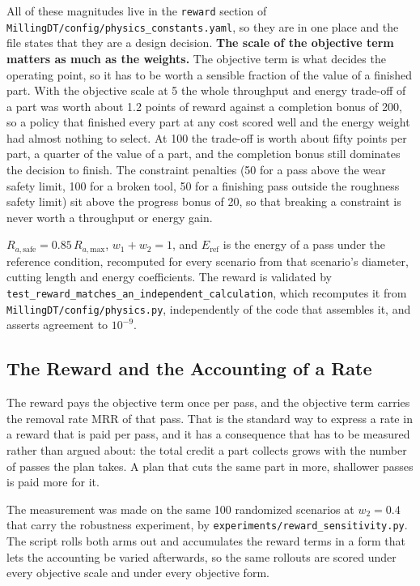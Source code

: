 \documentclass[11pt,a4paper]{article}
\newcommand{\MRR}{\mathrm{MRR}}
\newcommand{\RaSafe}{R_{a,\text{safe}}}
\newcommand{\RaMax}{R_{a,\text{max}}}
\begin{document}
All of these magnitudes live in the \texttt{reward} section of \texttt{MillingDT/\allowbreak config/\allowbreak physics\_\allowbreak constants.yaml}, so they are in one place and the file states that they are a design decision. \textbf{The scale of the objective term matters as much as the weights.} The objective term is what decides the operating point, so it has to be worth a sensible fraction of the value of a finished part. With the objective scale at 5 the whole throughput and energy trade-off of a part was worth about 1.2 points of reward against a completion bonus of 200, so a policy that finished every part at any cost scored well and the energy weight had almost nothing to select. At 100 the trade-off is worth about fifty points per part, a quarter of the value of a part, and the completion bonus still dominates the decision to finish. The constraint penalties (50 for a pass above the wear safety limit, 100 for a broken tool, 50 for a finishing pass outside the roughness safety limit) sit above the progress bonus of 20, so that breaking a constraint is never worth a throughput or energy gain.

$\RaSafe = 0.85\,\RaMax$, $w_1 + w_2 = 1$, and $E_\text{ref}$ is the energy of a pass under the reference condition, recomputed for every scenario from that scenario's diameter, cutting length and energy coefficients. The reward is validated by \texttt{test\_reward\_matches\_an\_independent\_calculation}, which recomputes it from \texttt{MillingDT/config/physics.py}, independently of the code that assembles it, and asserts agreement to $10^{-9}$.

\subsection{The Reward and the Accounting of a Rate}
\label{sec:rateaccounting}

The reward pays the objective term once per pass, and the objective term carries the removal rate $\MRR$ of that pass. That is the standard way to express a rate in a reward that is paid per pass, and it has a consequence that has to be measured rather than argued about: the total credit a part collects grows with the number of passes the plan takes. A plan that cuts the same part in more, shallower passes is paid more for it.

The measurement was made on the same 100 randomized scenarios at $w_2 = 0.4$ that carry the robustness experiment, by \texttt{experiments/\allowbreak reward\_sensitivity.py}. The script rolls both arms out and accumulates the reward terms in a form that lets the accounting be varied afterwards, so the same rollouts are scored under every objective scale and under every objective form.
\end{document}
